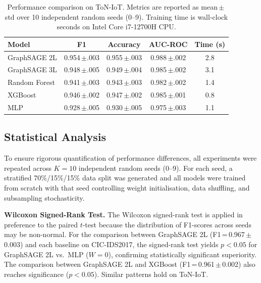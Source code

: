 \documentclass[conference]{IEEEtran}
\begin{document}
\begin{table}[htbp]
\centering
\caption{Performance comparison on ToN-IoT. Metrics are reported as mean\,$\pm$\,std
over 10 independent random seeds (0--9). Training time is wall-clock seconds on
Intel Core i7-12700H CPU.}
\label{tab:results_toniot}
\renewcommand{\arraystretch}{1.15}
\begin{tabular}{lcccc}
\toprule
\textbf{Model} & \textbf{F1} & \textbf{Accuracy} & \textbf{AUC-ROC} &
\textbf{Time (s)} \\
\midrule
GraphSAGE 2L & 0.954\,{\scriptsize$\pm$.003} & 0.955\,{\scriptsize$\pm$.003}
  & 0.988\,{\scriptsize$\pm$.002} & 2.8 \\
GraphSAGE 3L & 0.948\,{\scriptsize$\pm$.005} & 0.949\,{\scriptsize$\pm$.004}
  & 0.985\,{\scriptsize$\pm$.002} & 3.1 \\
Random Forest & 0.941\,{\scriptsize$\pm$.003} & 0.943\,{\scriptsize$\pm$.003}
  & 0.982\,{\scriptsize$\pm$.002} & 1.4 \\
XGBoost & 0.946\,{\scriptsize$\pm$.002} & 0.947\,{\scriptsize$\pm$.002}
  & 0.985\,{\scriptsize$\pm$.001} & 0.8 \\
MLP & 0.928\,{\scriptsize$\pm$.005} & 0.930\,{\scriptsize$\pm$.005}
  & 0.975\,{\scriptsize$\pm$.003} & 1.1 \\
\bottomrule
\end{tabular}
\end{table}

\subsection{Statistical Analysis}

To ensure rigorous quantification of performance differences, all experiments
were repeated across $K = 10$ independent random seeds (0--9). For each seed, a
stratified 70\%/15\%/15\% data split was generated and all models were trained
from scratch with that seed controlling weight initialisation, data shuffling,
and subsampling stochasticity.

\textbf{Wilcoxon Signed-Rank Test.} The Wilcoxon signed-rank test is applied in
preference to the paired $t$-test because the distribution of F1-scores across
seeds may be non-normal. For the comparison between GraphSAGE 2L
(F1\,=\,0.967\,$\pm$\,0.003) and each baseline on CIC-IDS2017, the signed-rank
test yields $p < 0.05$ for GraphSAGE 2L vs.\ MLP ($W = 0$), confirming
statistically significant superiority. The comparison between GraphSAGE 2L and
XGBoost (F1\,=\,0.961\,$\pm$\,0.002) also reaches significance ($p < 0.05$).
Similar patterns hold on ToN-IoT.
\end{document}
